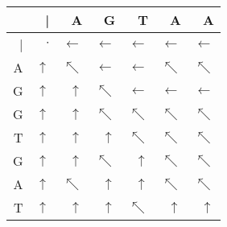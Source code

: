 \begin{tabular}{|r|r|r|r|r|r|r|}
\hline
 & | & A & G & T & A & A\\
\hline
| & $\cdot$ & $\leftarrow$ & $\leftarrow$ & $\leftarrow$ & $\leftarrow$ & $\leftarrow$\\
\hline
A & $\uparrow$ & $\nwarrow$ & $\leftarrow$ & $\leftarrow$ & $\nwarrow$ & $\nwarrow$\\
\hline
G & $\uparrow$ & $\uparrow$ & $\nwarrow$ & $\leftarrow$ & $\leftarrow$ & $\leftarrow$\\
\hline
G & $\uparrow$ & $\uparrow$ & $\nwarrow$ & $\nwarrow$ & $\nwarrow$ & $\nwarrow$\\
\hline
T & $\uparrow$ & $\uparrow$ & $\uparrow$ & $\nwarrow$ & $\nwarrow$ & $\nwarrow$\\
\hline
G & $\uparrow$ & $\uparrow$ & $\nwarrow$ & $\uparrow$ & $\nwarrow$ & $\nwarrow$\\
\hline
A & $\uparrow$ & $\nwarrow$ & $\uparrow$ & $\uparrow$ & $\nwarrow$ & $\nwarrow$\\
\hline
T & $\uparrow$ & $\uparrow$ & $\uparrow$ & $\nwarrow$ & $\uparrow$ & $\uparrow$\\
\hline
\end{tabular}
